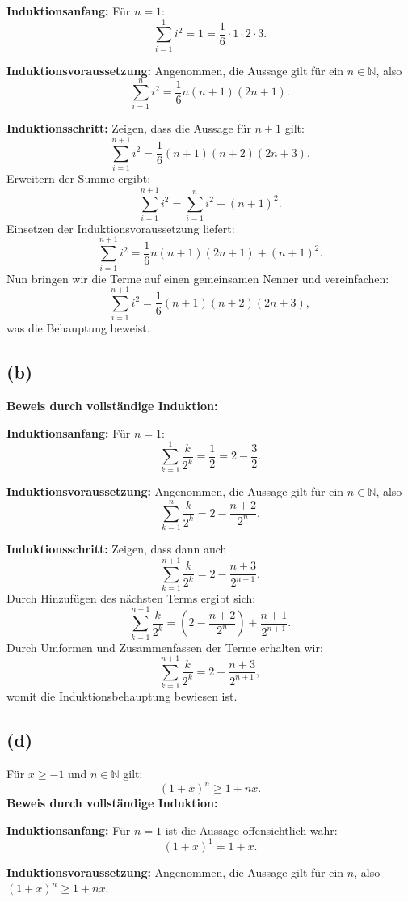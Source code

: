 \documentclass[a4paper]{scrartcl}
\begin{document}
\textbf{Induktionsanfang:} Für \( n = 1 \):
\[
\sum_{i=1}^1 i^2 = 1 = \frac{1}{6} \cdot 1 \cdot 2 \cdot 3.
\]

\textbf{Induktionsvoraussetzung:} Angenommen, die Aussage gilt für ein \( n \in \mathbb{N} \), also
\[
\sum_{i=1}^n i^2 = \frac{1}{6} n (n + 1) (2n + 1).
\]

\textbf{Induktionsschritt:} Zeigen, dass die Aussage für \( n+1 \) gilt:
\[
\sum_{i=1}^{n+1} i^2 = \frac{1}{6} (n+1)(n+2)(2n+3).
\]
Erweitern der Summe ergibt:
\[
\sum_{i=1}^{n+1} i^2 = \sum_{i=1}^n i^2 + (n+1)^2.
\]
Einsetzen der Induktionsvoraussetzung liefert:
\[
\sum_{i=1}^{n+1} i^2 = \frac{1}{6} n (n + 1) (2n + 1) + (n+1)^2.
\]
Nun bringen wir die Terme auf einen gemeinsamen Nenner und vereinfachen:
\[
\sum_{i=1}^{n+1} i^2 = \frac{1}{6} (n+1)(n+2)(2n+3),
\]
was die Behauptung beweist.

\subsection*{(b)}
\textbf{Beweis durch vollständige Induktion:}

\textbf{Induktionsanfang:} Für \( n = 1 \):
\[
\sum_{k=1}^1 \frac{k}{2^k} = \frac{1}{2} = 2 - \frac{3}{2}.
\]

\textbf{Induktionsvoraussetzung:} Angenommen, die Aussage gilt für ein \( n \in \mathbb{N} \), also
\[
\sum_{k=1}^n \frac{k}{2^k} = 2 - \frac{n + 2}{2^n}.
\]

\textbf{Induktionsschritt:} Zeigen, dass dann auch
\[
\sum_{k=1}^{n+1} \frac{k}{2^k} = 2 - \frac{n+3}{2^{n+1}}.
\]
Durch Hinzufügen des nächsten Terms ergibt sich:
\[
\sum_{k=1}^{n+1} \frac{k}{2^k} = \left(2 - \frac{n+2}{2^n}\right) + \frac{n+1}{2^{n+1}}.
\]
Durch Umformen und Zusammenfassen der Terme erhalten wir:
\[
\sum_{k=1}^{n+1} \frac{k}{2^k} = 2 - \frac{n+3}{2^{n+1}},
\]
womit die Induktionsbehauptung bewiesen ist.

\subsection*{(d)}
Für \( x \geq -1 \) und \( n \in \mathbb{N} \) gilt:
\[
(1 + x)^n \geq 1 + nx.
\]
\textbf{Beweis durch vollständige Induktion:}

\textbf{Induktionsanfang:} Für \( n = 1 \) ist die Aussage offensichtlich wahr:
\[
(1 + x)^1 = 1 + x.
\]

\textbf{Induktionsvoraussetzung:} Angenommen, die Aussage gilt für ein \( n \), also \( (1 + x)^n \geq 1 + nx \).
\end{document}

